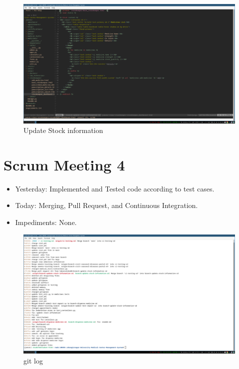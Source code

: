\documentclass[a4paper,12pt]{article}
\begin{document}
\begin{figure}[H]
    \centering
    \includegraphics[width=1\textwidth]{images/meet33.png}   
    \caption{Update Stock information}
    \label{fig:meet33}
\end{figure}


\newpage
\section{Scrum Meeting 4}
\begin{itemize}
    \item Yesterday: Implemented and Tested code according to test cases.
    \item Today: Merging, Pull Request, and Continuous Integration.
    \item Impediments: None.
\end{itemize}
\begin{figure}[H]
    \centering
    \includegraphics[width=1\textwidth]{images/meet41.png}
    \caption{git log}
    \label{fig:meet41}
\end{figure}
\end{document}
